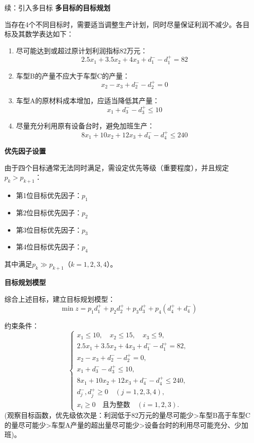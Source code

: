 \begin{exbox}{续：引入多目标}{}
    \textbf{多目标的目标规划}

当存在4个不同目标时，需要适当调整生产计划，同时尽量保证利润不减少。各目标及其数学表达如下：

\begin{enumerate}
    \item 尽可能达到或超过原计划利润指标82万元：
    \[ 2.5x_1 + 3.5x_2 + 4x_3 + d_1^- - d_1^+ = 82 \]
    
    \item 车型B的产量不应大于车型C的产量：
    \[ x_2 - x_3 + d_2^- - d_2^+ = 0 \]
    
    \item 车型A的原材料成本增加，应适当降低其产量：
    \[ x_1 + d_3^- - d_3^+ \leq 10 \]
    
    \item 尽量充分利用原有设备台时，避免加班生产：
    \[ 8x_1 + 10x_2 + 12x_3 + d_4^- - d_4^+ \leq 240 \]
\end{enumerate}

\noindent \textbf{优先因子设置}

由于四个目标通常无法同时满足，需设定优先等级（重要程度），并且规定$p_k>p_{k+1}$：
\begin{itemize}
    \item 第1位目标优先因子：$p_1$
    \item 第2位目标优先因子：$p_2$
    \item 第3位目标优先因子：$p_3$
    \item 第4位目标优先因子：$p_4$
\end{itemize}
其中满足$p_k \gg p_{k+1}$（$k=1,2,3,4$）。

\noindent \textbf{目标规划模型}

综合上述目标，建立目标规划模型：
\[ \min z = p_1 d_1^+ + p_2 d_2^+ + p_3 d_3^+ + p_4 (d_4^+ + d_4^-) \]

约束条件：
\[
\begin{cases}
    x_1 \leq 10, \quad x_2 \leq 15, \quad x_3 \leq 9, \\
    2.5x_1 + 3.5x_2 + 4x_3 + d_1^- - d_1^+ = 82, \\
    x_2 - x_3 + d_2^- - d_2^+ = 0, \\
    x_1 + d_3^- - d_3^+ \leq 10, \\
    8x_1 + 10x_2 + 12x_3 + d_4^- - d_4^+ \leq 240, \\
    d_j^-, d_j^+ \geq 0 \quad (j=1,2,3,4), \\
    x_i \geq 0 \quad \text{且为整数} \quad (i=1,2,3).
\end{cases}
\]
(观察目标函数，优先级依次是：利润低于82万元的量尽可能少>车型B高于车型C的量尽可能少>车型A产量的超出量尽可能少>设备台时的利用尽可能充分、少加班)。
\end{exbox}

